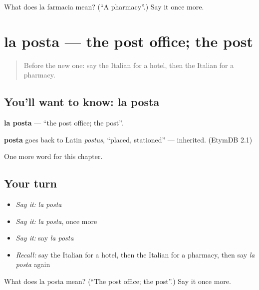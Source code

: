 \begin{tcolorbox}[breakable,colback=teal!4,colframe=teal!35!black,title={Before you move on}]
What does la farmacia mean? (\textquotedblleft{}A pharmacy\textquotedblright{}.) Say it once more.
\end{tcolorbox}
\section[la posta]{la posta — the post office; the post}

\label{lesson:IT-C84-posta}



\begin{quote}
Before the new one: say the Italian for a hotel, then the Italian for a pharmacy.
\end{quote}

\subsection*{You'll want to know: la posta}
\textbf{la posta} — \textquotedblleft{}the post office; the post\textquotedblright{}.

\begin{cousinweb}
\textbf{posta} goes back to Latin \emph{postus}, \textquotedblleft{}placed, stationed\textquotedblright{} — inherited. (EtymDB 2.1)
\end{cousinweb}

\begin{grammarlens}[title={What you've built}]
One more word for this chapter.
\end{grammarlens}

\subsection*{Your turn}
\begin{itemize}
\raggedright
  \item \emph{Say it:} \emph{la posta}
  \item \emph{Say it:} \emph{la posta}, once more
  \item \emph{Say it:} say \emph{la posta}
  \item \emph{Recall:} say the Italian for a hotel, then the Italian for a pharmacy, then say \emph{la posta} again
\end{itemize}

\begin{tcolorbox}[breakable,colback=teal!4,colframe=teal!35!black,title={Before you move on}]
What does la posta mean? (\textquotedblleft{}The post office; the post\textquotedblright{}.) Say it once more.
\end{tcolorbox}
